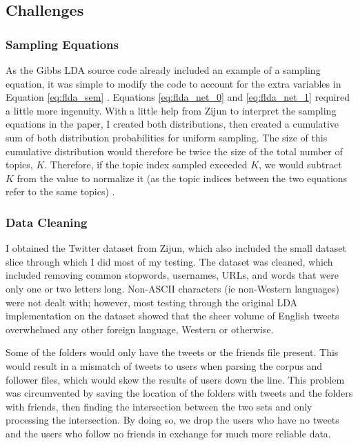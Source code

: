 \documentclass[a4paper]{article}
\begin{document}
\subsection{Challenges}\label{sec:challenges}

\subsubsection{Sampling Equations}\label{sec:samp_eqns}
As the Gibbs LDA source code already included an example of a sampling equation, it was simple to modify the code to account for the extra variables in Equation \ref{eq:flda_sem} \cite{gibbs_lda}. Equations \ref{eq:flda_net_0} and \ref{eq:flda_net_1} required a little more ingenuity. With a little help from Zijun to interpret the sampling equations in the paper, I created both distributions, then created a cumulative sum of both distribution probabilities for uniform sampling. The size of this cumulative distribution would therefore be twice the size of the total number of topics, $K$. Therefore, if the topic index sampled exceeded $K$, we would subtract $K$ from the value to normalize it (as the topic indices between the two equations refer to the same topics) \cite{flda}.

\subsubsection{Data Cleaning}
I obtained the Twitter dataset from Zijun, which also included the small dataset slice through which I did most of my testing. The dataset was cleaned, which included removing common stopwords, usernames, URLs, and words that were only one or two letters long. Non-ASCII characters (ie non-Western languages) were not dealt with; however, most testing through the original LDA implementation on the dataset showed that the sheer volume of English tweets overwhelmed any other foreign language, Western or otherwise.

Some of the folders would only have the tweets or the friends file present. This would result in a mismatch of tweets to users when parsing the corpus and follower files, which would skew the results of users down the line. This problem was circumvented by saving the location of the folders with tweets and the folders with friends, then finding the intersection between the two sets and only processing the intersection. By doing so, we drop the users who have no tweets and the users who follow no friends in exchange for much more reliable data.
\end{document}
